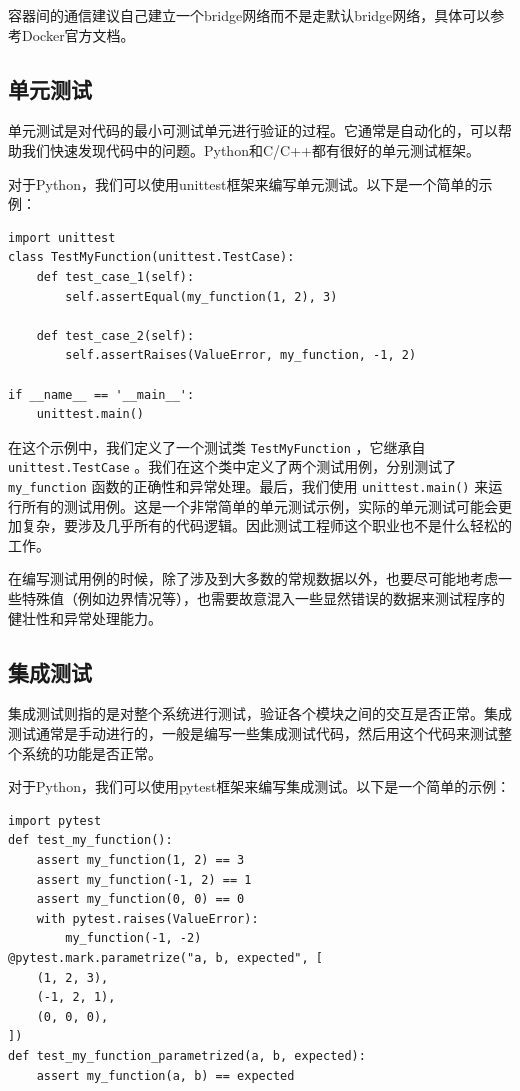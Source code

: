 容器间的通信建议自己建立一个bridge网络而不是走默认bridge网络，具体可以参考Docker官方文档。

\subsection{单元测试}

单元测试是对代码的最小可测试单元进行验证的过程。它通常是自动化的，可以帮助我们快速发现代码中的问题。Python和C/C++都有很好的单元测试框架。

对于Python，我们可以使用unittest框架来编写单元测试。以下是一个简单的示例：
\begin{verbatim}
import unittest
class TestMyFunction(unittest.TestCase):
    def test_case_1(self):
        self.assertEqual(my_function(1, 2), 3)

    def test_case_2(self):
        self.assertRaises(ValueError, my_function, -1, 2)

if __name__ == '__main__':
    unittest.main()
\end{verbatim}
在这个示例中，我们定义了一个测试类 \texttt{TestMyFunction} ，它继承自 \texttt{unittest.TestCase} 。我们在这个类中定义了两个测试用例，分别测试了 \texttt{my\_function} 函数的正确性和异常处理。最后，我们使用 \texttt{unittest.main()} 来运行所有的测试用例。这是一个非常简单的单元测试示例，实际的单元测试可能会更加复杂，要涉及几乎所有的代码逻辑。因此测试工程师这个职业也不是什么轻松的工作。

在编写测试用例的时候，除了涉及到大多数的常规数据以外，也要尽可能地考虑一些特殊值（例如边界情况等），也需要故意混入一些显然错误的数据来测试程序的健壮性和异常处理能力。

\subsection{集成测试}

集成测试则指的是对整个系统进行测试，验证各个模块之间的交互是否正常。集成测试通常是手动进行的，一般是编写一些集成测试代码，然后用这个代码来测试整个系统的功能是否正常。

对于Python，我们可以使用pytest框架来编写集成测试。以下是一个简单的示例：
\begin{verbatim}
import pytest
def test_my_function():
    assert my_function(1, 2) == 3
    assert my_function(-1, 2) == 1
    assert my_function(0, 0) == 0
    with pytest.raises(ValueError):
        my_function(-1, -2)
@pytest.mark.parametrize("a, b, expected", [
    (1, 2, 3),
    (-1, 2, 1),
    (0, 0, 0),
])
def test_my_function_parametrized(a, b, expected):
    assert my_function(a, b) == expected
\end{verbatim}

